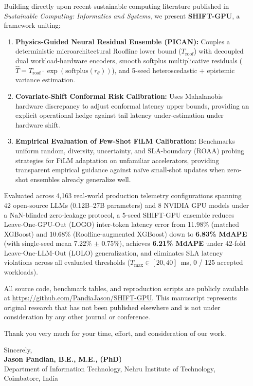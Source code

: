 \documentclass[11pt]{article}
\begin{document}
Building directly upon recent sustainable computing literature published in \textit{Sustainable Computing: Informatics and Systems}, we present \textbf{SHIFT-GPU}, a framework uniting:
\begin{enumerate}
    \item \textbf{Physics-Guided Neural Residual Ensemble (PICAN):} Couples a deterministic microarchitectural Roofline lower bound ($T_{\text{roof}}$) with decoupled dual workload-hardware encoders, smooth softplus multiplicative residuals ($\hat{T} = T_{\text{roof}} \cdot \exp(\mathrm{softplus}(r_\theta))$), and 5-seed heteroscedastic + epistemic variance estimation.
    \item \textbf{Covariate-Shift Conformal Risk Calibration:} Uses Mahalanobis hardware discrepancy to adjust conformal latency upper bounds, providing an explicit operational hedge against tail latency under-estimation under hardware shift.
    \item \textbf{Empirical Evaluation of Few-Shot FiLM Calibration:} Benchmarks uniform random, diversity, uncertainty, and SLA-boundary (ROAA) probing strategies for FiLM adaptation on unfamiliar accelerators, providing transparent empirical guidance against na\"ive small-shot updates when zero-shot ensembles already generalize well.
\end{enumerate}

Evaluated across 4,163 real-world production telemetry configurations spanning 42 open-source LLMs (0.12B--27B parameters) and 8 NVIDIA GPU models under a NaN-blinded zero-leakage protocol, a 5-seed SHIFT-GPU ensemble reduces Leave-One-GPU-Out (LOGO) inter-token latency error from 11.98\% (matched XGBoost) and 10.68\% (Roofline-augmented XGBoost) down to \textbf{6.83\% MdAPE} (with single-seed mean 7.22\% $\pm$ 0.75\%), achieves \textbf{6.21\% MdAPE} under 42-fold Leave-One-LLM-Out (LOLO) generalization, and eliminates SLA latency violations across all evaluated thresholds ($T_{\max} \in [20, 40]$~ms, 0 / 125 accepted workloads).

All source code, benchmark tables, and reproduction scripts are publicly available at \url{https://github.com/PandiaJason/SHIFT-GPU}. This manuscript represents original research that has not been published elsewhere and is not under consideration by any other journal or conference.

Thank you very much for your time, effort, and consideration of our work.

\vspace{1.5em}
\noindent
Sincerely,\\[1em]
\textbf{Jason Pandian, B.E., M.E., (PhD)}\\
Department of Information Technology, Nehru Institute of Technology, Coimbatore, India
\end{document}
